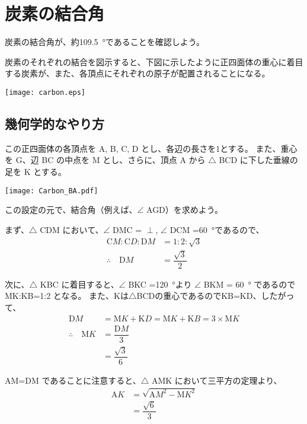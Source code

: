 \documentclass[a4paper,11pt]{jlreq}
\begin{document}
\section{炭素の結合角}
\label{sec: carbon_BA}

炭素の結合角が、約\qty{109.5}{\degree}であることを確認しよう。

炭素のそれぞれの結合を図示すると、下図に示したように正四面体の重心に着目する炭素が、また、各頂点にそれぞれの原子が配置されることになる。

\begin{center}
	\texttt{[image: carbon.eps]}
\end{center}

\subsection{幾何学的なやり方}

この正四面体の各頂点を A, B, C, D とし、各辺の長さを1とする。
また、重心を G、辺 BC の中点を M とし、さらに、頂点 A から $\bigtriangleup$ BCD に下した垂線の足を K とする。


\begin{center}
	\texttt{[image: Carbon\_BA.pdf]}
\end{center}
この設定の元で、結合角（例えば、$\angle$ AGD）を求めよう。

まず、$\bigtriangleup$ CDM において、$\angle$ DMC = $\perp$, $\angle$ DCM =\qty{60}{\degree}であるので、
\begin{align*}
{\mathrm CM} : {\mathrm CD} : {\mathrm DM} &= 1: 2 : \sqrt{3} \\
\therefore \quad {\mathrm DM} &= \dfrac{\sqrt{3}}{2}
\end{align*}

次に、$\bigtriangleup$ KBC に着目すると、$\angle$ BKC =\qty{120}{\degree}より $\angle$ BKM = \qty{60}{\degree} であるので MK:KB=1:2 となる。
また、Kは$\bigtriangleup$BCDの重心であるのでKB=KD、したがって、
\begin{align*}
{\mathrm DM} &= {\mathrm MK} + {\mathrm KD} = {\mathrm MK} + {\mathrm KB} = 3 \times {\mathrm MK} \\
\therefore \quad {\mathrm MK} 
	&=\dfrac{ {\mathrm DM} }{3} \\
	&=\dfrac{\sqrt{3}}{6}
\end{align*}

AM=DM であることに注意すると、$\bigtriangleup$ AMK において三平方の定理より、
\begin{align*}
{\mathrm AK} 
	&= \sqrt{ {\mathrm AM}^2 - {\mathrm MK}^2 } \\
	&= \dfrac{\sqrt{6}}{3}
\end{align*}
\end{document}
